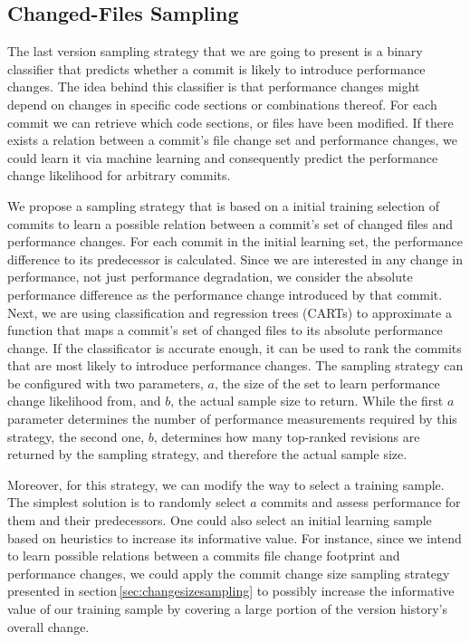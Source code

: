 \subsection{Changed-Files Sampling}
The last version sampling strategy that we are going to present is a binary
classifier that predicts whether a commit is likely to introduce performance
changes. The idea behind this classifier is that performance changes might
depend on changes in specific code sections or combinations thereof. For each
commit we can retrieve which code sections, or files have been modified. If
there exists a relation between a commit’s file change set and performance
changes, we could learn it via machine learning and consequently predict
the performance change likelihood for arbitrary commits.

We propose a sampling strategy that is based on a initial training selection of
commits to learn a possible relation between a commit’s set of changed files
and performance changes. For each commit in the initial learning set, the
performance difference to its predecessor is calculated. Since we are
interested in any change in performance, not just performance degradation, we
consider the absolute performance difference as the performance change introduced by that
commit. Next, we are using classification and regression trees (CARTs) to
approximate a function that maps a commit’s set of changed files to its
absolute performance change. If the classificator is accurate enough, it can be
used to rank the commits that are most likely to introduce performance
changes. The sampling strategy can be configured with two parameters, $a$, the
size of the set to learn performance change likelihood from, and $b$, the
actual sample size to return. While the first $a$ parameter determines the
number of performance measurements required by this strategy, the second one,
$b$, determines how many top-ranked revisions are returned by the sampling
strategy, and therefore the actual sample size.

Moreover, for this strategy, we can modify the way to select a training sample.
The simplest solution is to randomly select $a$ commits and assess performance
for them and their predecessors. One could also select an initial learning
sample based on heuristics to increase its informative value. For instance,
since we intend to learn possible relations between a commits file change
footprint and performance changes, we could apply the commit change size
sampling strategy presented in section\,\ref{sec:changesizesampling} to possibly
increase the informative value of our training sample by covering a large
portion of the version history's overall change.

